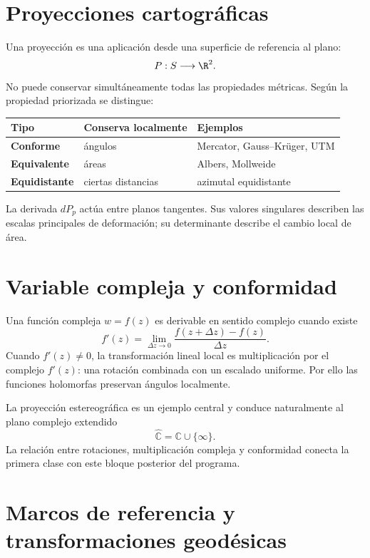 \section{Proyecciones cartográficas}\label{sec:proyecciones}

Una proyección es una aplicación desde una superficie de referencia al plano:
\[
  P:S\longrightarrow\R^2.
\]
No puede conservar simultáneamente todas las propiedades métricas. Según la propiedad
priorizada se distingue:

\begin{center}
\begin{tabularx}{.92\textwidth}{>{\bfseries}l X X}
\toprule
Tipo & Conserva localmente & Ejemplos\\
\midrule
Conforme & ángulos & Mercator, Gauss--Krüger, UTM\\
Equivalente & áreas & Albers, Mollweide\\
Equidistante & ciertas distancias & azimutal equidistante\\
\bottomrule
\end{tabularx}
\end{center}

La derivada \(dP_p\) actúa entre planos tangentes. Sus valores singulares describen las
escalas principales de deformación; su determinante describe el cambio local de área.

\section{Variable compleja y conformidad}

Una función compleja \(w=f(z)\) es derivable en sentido complejo cuando existe
\[
  f'(z)=\lim_{\Delta z\to0}
  \frac{f(z+\Delta z)-f(z)}{\Delta z}.
\]
Cuando \(f'(z)\neq0\), la transformación lineal local es multiplicación por el complejo
\(f'(z)\): una rotación combinada con un escalado uniforme. Por ello las funciones holomorfas
preservan ángulos localmente.

La proyección estereográfica es un ejemplo central y conduce naturalmente al plano complejo
extendido
\[
  \widehat{\mathbb C}=\mathbb C\cup\{\infty\}.
\]
La relación entre rotaciones, multiplicación compleja y conformidad conecta la primera clase
con este bloque posterior del programa.

\section{Marcos de referencia y transformaciones geodésicas}

